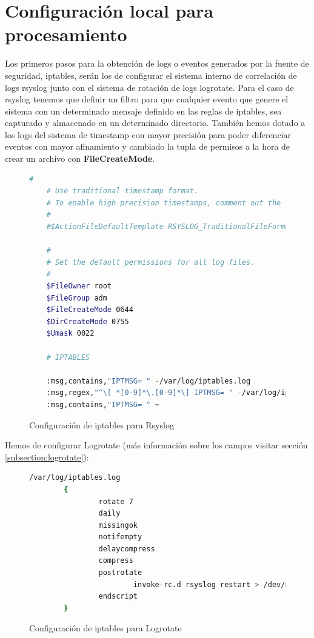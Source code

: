\section[Configuración local]{Configuración local para procesamiento}
Los primeros pasos para la obtención de logs o eventos generados por la fuente de seguridad, iptables, serán los de configurar el sistema interno de correlación de logs rsyslog junto con el sistema de rotación de logs logrotate. Para el caso de rsyslog tenemos que definir un filtro para que cualquier evento que genere el sistema con un determinado mensaje definido en las reglas de iptables, sea capturado y almacenado en un determinado directorio. También hemos dotado a los logs del sistema de timestamp con mayor precisión para poder diferenciar eventos con mayor afinamiento y cambiado la tupla de permisos a la hora de crear un archivo con \textbf{FileCreateMode}.

\begin{figure}[H]
  \begin{lstlisting}[language=bash]
    #
    # Use traditional timestamp format.
    # To enable high precision timestamps, comment out the following line.
    #
    #$ActionFileDefaultTemplate RSYSLOG_TraditionalFileFormat

    #
    # Set the default permissions for all log files.
    #
    $FileOwner root
    $FileGroup adm
    $FileCreateMode 0644
    $DirCreateMode 0755
    $Umask 0022

    # IPTABLES

    :msg,contains,"IPTMSG= " -/var/log/iptables.log
    :msg,regex,"^\[ *[0-9]*\.[0-9]*\] IPTMSG= " -/var/log/iptables.log
    :msg,contains,"IPTMSG= " ~

  \end{lstlisting}
  \caption{Configuración de iptables para Rsyslog}
\end{figure}
\pagebreak
Hemos de configurar Logrotate (más información sobre los campos visitar sección \ref{subsection:logrotate}):

\begin{figure}[H]
\begin{lstlisting}[language=bash]
/var/log/iptables.log
        {
                rotate 7
                daily
                missingok
                notifempty
                delaycompress
                compress
                postrotate
                        invoke-rc.d rsyslog restart > /dev/null
                endscript
        }
\end{lstlisting}
\caption{Configuración de iptables para Logrotate}
\end{figure}

